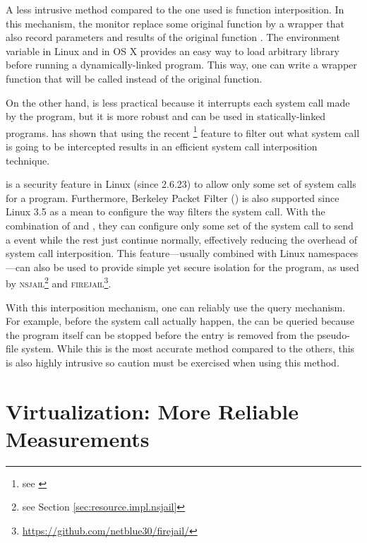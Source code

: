 A less intrusive method compared to the one  used is function interposition.
In this mechanism, the monitor replace some original function by a wrapper that also record parameters and results of the original function \citep{juvePracticalResourceMonitoring2015}.
The environment variable  in Linux and  in OS X provides an easy way to load arbitrary library before running a dynamically-linked program.
This way, one can write a wrapper function that will be called instead of the original function.

On the other hand,  is less practical because it interrupts each system call made by the program, but it is more robust and can be used in statically-linked programs.
\citet{kimPracticalEffectiveSandboxing2013} has shown that using the recent \footnote{see \href{http://man7.org/linux/man-pages/man2/seccomp.2.html}{}} feature to filter out what system call is going to be intercepted results in an efficient system call interposition technique.

 is a security feature in Linux (since 2.6.23) to allow only some set of system calls for a program.
Furthermore, Berkeley Packet Filter () is also supported since Linux 3.5 as a mean to configure the way  filters the system call.
With the combination of  and , they can configure only some set of the system call to send a  event while the rest just continue normally, effectively reducing the overhead of system call interposition.
This feature---usually combined with Linux namespaces---can also be used to provide simple yet secure isolation for the program, as used by \textsc{nsjail}\footnote{see Section \ref{sec:resource.impl.nsjail}} and \textsc{firejail}\footnote{\href{https://github.com/netblue30/firejail/}{https://github.com/netblue30/firejail/}}.

With this interposition mechanism, one can reliably use the query mechanism.
For example, before the  system call actually happen, the  can be queried because the program itself can be stopped before the entry is removed from the pseudo-file system.
While this is the most accurate method compared to the others, this is also highly intrusive so caution must be exercised when using this method.

\section{Virtualization: More Reliable Measurements}
\label{sec:resource.virtualization}

